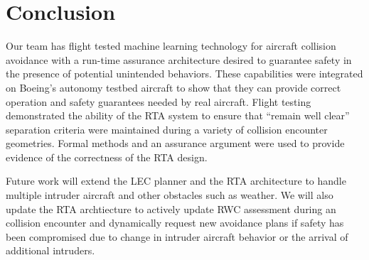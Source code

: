 \section{Conclusion}

%
%


Our team has flight tested machine learning technology for aircraft collision avoidance with a
run-time assurance architecture desired to guarantee safety in the presence of potential
unintended behaviors.  These capabilities were integrated on Boeing’s
autonomy testbed aircraft to show that they can provide correct operation and
safety guarantees needed by real aircraft.  Flight testing demonstrated the ability of the RTA
system to ensure that ``remain well clear'' separation criteria were maintained during a variety of 
collision encounter geometries.  Formal methods and an assurance argument were used to 
provide evidence of the correctness of the RTA design. 

Future work will extend the LEC planner and the RTA architecture to handle multiple intruder 
aircraft and other obstacles such as weather.  We will also update the RTA archtiecture to 
actively update RWC assessment during an collision encounter and dynamically request
new avoidance plans if safety has been compromised due to change in intruder aircraft behavior 
or the arrival of additional intruders.  
